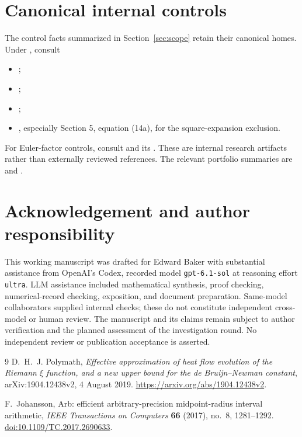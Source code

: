\documentclass[11pt]{article}
\theoremstyle{remark}\newtheorem{remark}[theorem]{Remark}
\begin{document}
\section{Canonical internal controls}\label{sec:controls}
The control facts summarized in Section~\ref{sec:scope} retain their canonical homes. Under , consult
\begin{itemize}
\item {};
\item {};
\item {};
\item {}, especially Section 5, equation (14a), for the square-expansion exclusion.
\end{itemize}
For Euler-factor controls, consult  and its . These are internal research artifacts rather than externally reviewed references. The relevant portfolio summaries are  and .

\section*{Acknowledgement and author responsibility}
This working manuscript was drafted for Edward Baker with substantial assistance from OpenAI's Codex, recorded model \texttt{gpt-6.1-sol} at reasoning effort \texttt{ultra}. LLM assistance included mathematical synthesis, proof checking, numerical-record checking, exposition, and document preparation. Same-model collaborators supplied internal checks; these do not constitute independent cross-model or human review. The manuscript and its claims remain subject to author verification and the planned assessment of the investigation round. No independent review or publication acceptance is asserted.

\begin{thebibliography}{9}
D.~H.~J. Polymath,
\emph{Effective approximation of heat flow evolution of the Riemann $\xi$ function, and a new upper bound for the de Bruijn--Newman constant},
arXiv:1904.12438v2, 4 August 2019.
\url{https://arxiv.org/abs/1904.12438v2}.

F.~Johansson,
Arb: efficient arbitrary-precision midpoint-radius interval arithmetic,
\emph{IEEE Transactions on Computers} \textbf{66} (2017), no.~8, 1281--1292.
\href{https://doi.org/10.1109/TC.2017.2690633}{doi:10.1109/TC.2017.2690633}.
\end{thebibliography}
\end{document}
